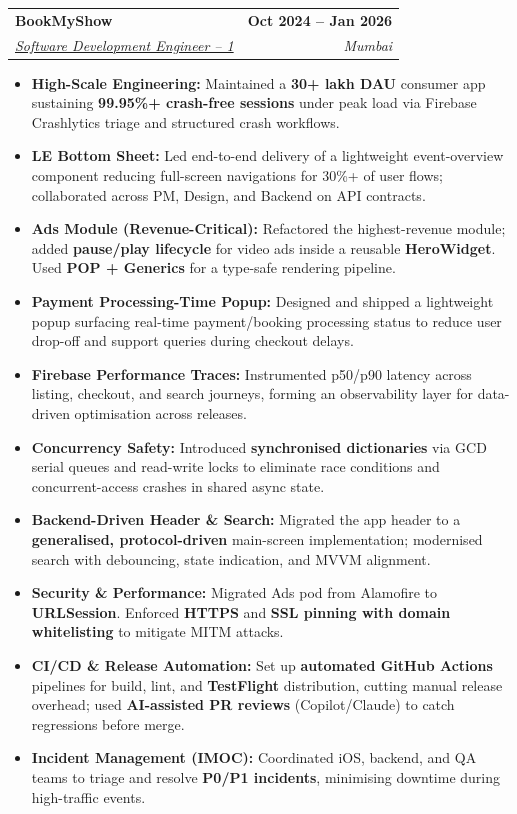 \documentclass[letterpaper,10.4pt]{article}
\makeatletter
\newcommand{\resumeItem}[1]{%
  \item\small{#1}%
}
\newcommand{\resumeSubheading}[4]{%
  \vspace{4pt}\item
    \begin{tabular*}{1.0\textwidth}[t]{l@{\extracolsep{\fill}}r}
      \textbf{\large#1} & \textbf{\small #2} \\
      \textit{\large#3} & \textit{\small #4} \\
    \end{tabular*}\vspace{-6pt}%
}
\newcommand{\resumeItemListStart}{%
  \begin{itemize}[topsep=1pt, itemsep=0pt, parsep=0pt, leftmargin=*]%
}
\newcommand{\resumeItemListEnd}{\end{itemize}\vspace{0pt}}
\makeatother
\begin{document}
\resumeSubheading
  {BookMyShow \href{https://in.bookmyshow.com/}{\faExternalLink*}}{Oct 2024 -- Jan 2026}
  {\underline{Software Development Engineer -- 1}}{Mumbai}
    \vspace{0pt}
  \resumeItemListStart
    \resumeItem{\textbf{High-Scale Engineering:} Maintained a \textbf{30+ lakh DAU} consumer app sustaining \textbf{99.95\%+ crash-free sessions} under peak load via Firebase Crashlytics triage and structured crash workflows.}
    \resumeItem{\textbf{LE Bottom Sheet:} Led end-to-end delivery of a lightweight event-overview component reducing full-screen navigations for 30\%+ of user flows; collaborated across PM, Design, and Backend on API contracts.}
    \resumeItem{\textbf{Ads Module (Revenue-Critical):} Refactored the highest-revenue module; added \textbf{pause/play lifecycle} for video ads inside a reusable \textbf{HeroWidget}. Used \textbf{POP + Generics} for a type-safe rendering pipeline.}
    \resumeItem{\textbf{Payment Processing-Time Popup:} Designed and shipped a lightweight popup surfacing real-time payment/booking processing status to reduce user drop-off and support queries during checkout delays.}
    \resumeItem{\textbf{Firebase Performance Traces:} Instrumented p50/p90 latency across listing, checkout, and search journeys, forming an observability layer for data-driven optimisation across releases.}
    \resumeItem{\textbf{Concurrency Safety:} Introduced \textbf{synchronised dictionaries} via GCD serial queues and read-write locks to eliminate race conditions and concurrent-access crashes in shared async state.}
    \resumeItem{\textbf{Backend-Driven Header \& Search:} Migrated the app header to a \textbf{generalised, protocol-driven} main-screen implementation; modernised search with debouncing, state indication, and MVVM alignment.}
    \resumeItem{\textbf{Security \& Performance:} Migrated Ads pod from Alamofire to \textbf{URLSession}. Enforced \textbf{HTTPS} and \textbf{SSL pinning with domain whitelisting} to mitigate MITM attacks.}
    \resumeItem{\textbf{CI/CD \& Release Automation:} Set up \textbf{automated GitHub Actions} pipelines for build, lint, and \textbf{TestFlight} distribution, cutting manual release overhead; used \textbf{AI-assisted PR reviews} (Copilot/Claude) to catch regressions before merge.}
    \resumeItem{\textbf{Incident Management (IMOC):} Coordinated iOS, backend, and QA teams to triage and resolve \textbf{P0/P1 incidents}, minimising downtime during high-traffic events.}
  \resumeItemListEnd
\end{document}
